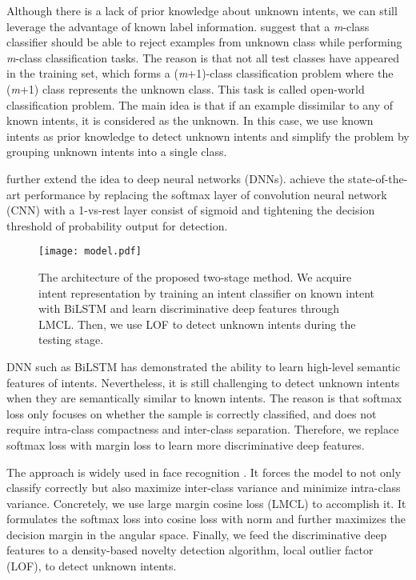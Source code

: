 \documentclass[11pt,a4paper]{article}
\begin{document}
Although there is a lack of prior knowledge about unknown intents, we can still leverage the advantage of known label information. \citet{Scheirer2013TowardOS,Fei2016BreakingTC} suggest that a \emph{m}-class classifier should be able to reject examples from unknown class while performing \emph{m}-class classification tasks. The reason is that not all test classes have appeared in the training set, which forms a (\emph{m}+1)-class classification problem where the (\emph{m}+1) class represents the unknown class. This task is called open-world classification problem. The main idea is that if an example dissimilar to any of known intents, it is considered as the unknown. In this case, we use known intents as prior knowledge to detect unknown intents and simplify the problem by grouping unknown intents into a single class.

\citet{Bendale2016TowardsOS} further extend the idea to deep neural networks (DNNs). \citet{Shu2017DOCDO} achieve the state-of-the-art performance by replacing the softmax layer of convolution neural network (CNN) with a 1-vs-rest layer consist of sigmoid and tightening the decision threshold of probability output for detection.
\begin{figure*}[t]
  \centering
  \texttt{[image: model.pdf]}
  \caption{The architecture of the proposed two-stage method. We acquire intent representation by training an intent classifier on known intent with BiLSTM and learn discriminative deep features through LMCL. Then, we use LOF to detect unknown intents during the testing stage. \label{model}}
\end{figure*}

DNN such as BiLSTM \cite{Goo2018SlotGatedMF, Wang2018ABB} has demonstrated the ability to learn high-level semantic features of intents. Nevertheless, it is still challenging to detect unknown intents when they are semantically similar to known intents. The reason is that softmax loss only focuses on whether the sample is correctly classified, and does not require intra-class compactness and inter-class separation. Therefore, we replace softmax loss with margin loss to learn more discriminative deep features. 

The approach is widely used in face recognition \cite{DBLP:conf/icml/LiuWYY16, DBLP:conf/cvpr/LiuWYLRS17, DBLP:journals/corr/RanjanCC17}. It forces the model to not only classify correctly but also maximize inter-class variance and minimize intra-class variance. Concretely, we use large margin cosine loss (LMCL) \cite{DBLP:conf/cvpr/WangWZJGZL018} to accomplish it. It formulates the softmax loss into cosine loss with  norm and further maximizes the decision margin in the angular space. Finally, we feed the discriminative deep features to a density-based novelty detection algorithm, local outlier factor (LOF), to detect unknown intents.
\end{document}
